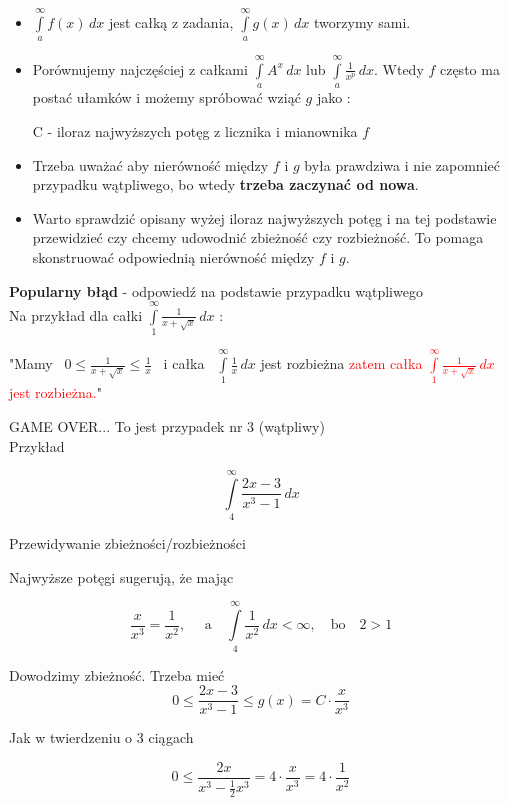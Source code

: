 \documentclass[12pt]{article}
\begin{document}
\begin{itemize}
    \item $ \int\limits_{a}^{\infty} f(x) \,dx $ jest całką z zadania, $ \int\limits_{a}^{\infty} g(x) \,dx $ tworzymy sami.
    \item Porównujemy najczęściej z całkami $ \int\limits_{a}^{\infty} A^x \,dx $ lub 
    $ \int\limits_{a}^{\infty} \frac{1}{x^p} \,dx $. Wtedy $f$ często ma postać ułamków i możemy spróbować
    wziąć $g$ jako :

    \quad C - iloraz najwyższych potęg z licznika i mianownika $f$

    \item Trzeba uważać aby nierówność między $f$ i $g$ była prawdziwa i nie zapomnieć przypadku wątpliwego, bo wtedy
    \textbf{trzeba zaczynać od nowa}.

    \item Warto sprawdzić opisany wyżej iloraz najwyższych potęg i na tej podstawie przewidzieć czy chcemy
    udowodnić zbieżność czy rozbieżność. To pomaga skonstruować odpowiednią nierówność między $f$ i $g$.
\end{itemize}

\textbf{Popularny błąd} - odpowiedź na podstawie przypadku wątpliwego \\

Na przykład dla całki $ \int\limits_1^\infty \frac{1}{x + \sqrt{x}} \,dx $ : 

"Mamy \ $ 0 \leq \frac{1}{x + \sqrt{x}} \leq \frac{1}{x} $ \ i całka \ $ \int\limits_1^\infty \frac{1}{x} \,dx $
jest rozbieżna \textcolor{red}{zatem całka $ \int\limits_{1}^{\infty} \frac{1}{x + \sqrt{x}} \,dx $ jest rozbieżna.}"

GAME OVER... To jest przypadek nr 3 (wątpliwy) \\

Przykład

$$ \int\limits_4^\infty \frac{2x - 3}{x^3 - 1} \,dx $$

Przewidywanie zbieżności/rozbieżności

Najwyższe potęgi sugerują, że mając

$$ \frac{x}{x^3} = \frac{1}{x^2}, \quad \textrm{ a} \quad \int\limits_4^\infty \frac{1}{x^2} \,dx < \infty, \quad \textrm{bo} \quad 2 > 1 $$

Dowodzimy zbieżność. Trzeba mieć
$$ 0 \leq \frac{2x - 3}{x^3 - 1} \leq g(x) = C \cdot \frac{x}{x^3} $$

Jak w twierdzeniu o 3 ciągach

$$ 0 \leq \frac{2x}{x^3 - \frac{1}{2}x^3} = 4 \cdot \frac{x}{x^3} = 4 \cdot \frac{1}{x^2} $$
\end{document}
